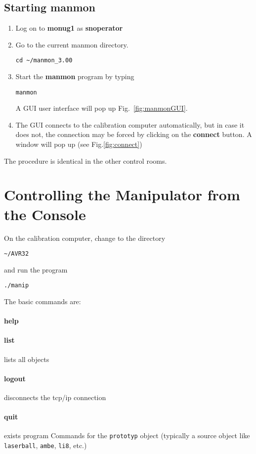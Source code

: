 \subsection{Starting manmon}
\begin{enumerate}
\item Log on to \textbf{monug1} as \textbf{snoperator}
\item Go to the current manmon directory.
\begin{verbatim}
cd ~/manmon_3.00
\end{verbatim}
\item Start the \textbf{manmon} program by typing
\begin{verbatim}
manmon
\end{verbatim}
A GUI user interface will pop up Fig.~\ref{fig:manmonGUI}.
\item The GUI connects to the calibration computer automatically, but
  in case it does not, the connection may be forced by clicking on the
  \textbf{connect} button. A window will pop up (see
  Fig.\ref{fig:connect}) 
\end{enumerate}
The procedure is identical in the other control rooms.


\section{Controlling the Manipulator from the Console}
On the calibration computer, change to the directory
\begin{verbatim}
~/AVR32
\end{verbatim}
and run the program
\begin{verbatim}
./manip
\end{verbatim}
The basic commands are:
\paragraph{help}
\paragraph{list} lists all objects
\paragraph{logout} disconnects the tcp/ip connection
\paragraph{quit} exists program
Commands for the \verb+prototyp+ object (typically a source object
like \verb+laserball+, \verb+ambe+, \verb+li8+, etc.)
